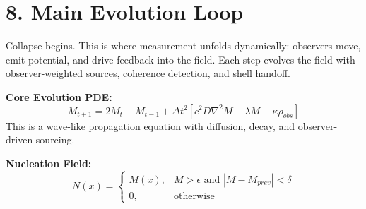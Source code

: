 \section*{8. Main Evolution Loop}
Collapse begins. This is where measurement unfolds dynamically: observers move, emit potential, and drive feedback into the field. Each step evolves the field with observer-weighted sources, coherence detection, and shell handoff.

\textbf{Core Evolution PDE:}
\[
M_{t+1} = 2M_t - M_{t-1} + \Delta t^2 \left[c^2 D \nabla^2 M - \lambda M + \kappa \rho_{obs} \right]
\]
This is a wave-like propagation equation with diffusion, decay, and observer-driven sourcing.

\textbf{Nucleation Field:}
\[
N(x) = \begin{cases} M(x), & M > \epsilon \text{ and } |M - M_{prev}| < \delta \\ 0, & \text{otherwise} \end{cases}
\]
